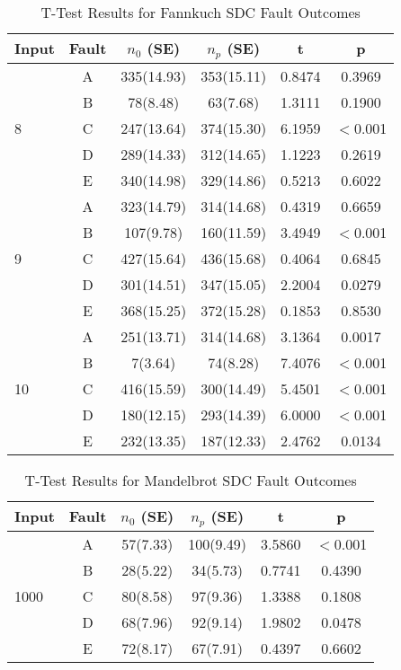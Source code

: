 \begin{table}[htbp]
\small{
\begin{center}
    \begin{tabular}{|p{0.7cm}|c|c|c|c|c|}
    \hline
    \textbf{Input} & \textbf{Fault} & \textbf{$n_0$ (SE)} & \textbf{$n_p$ (SE)} & \textbf{t} & \textbf{p} \\ \hline
    \multirow{5}{*}{8}
    & A & 335(14.93) & 353(15.11) & 0.8474 & 0.3969 \\
	& B & 78(8.48) & 63(7.68) & 1.3111 &  0.1900 \\
 	& C & 247(13.64) & 374(15.30) & 6.1959 & $<$0.001 \\
 	& D & 289(14.33) & 312(14.65) & 1.1223 & 0.2619 \\
 	& E & 340(14.98) & 329(14.86) & 0.5213 & 0.6022 \\ \hline
    \multirow{5}{*}{9}
    & A & 323(14.79) & 314(14.68) & 0.4319 & 0.6659 \\
	& B & 107(9.78) & 160(11.59) & 3.4949 & $<$0.001 \\
 	& C & 427(15.64) & 436(15.68) & 0.4064 & 0.6845 \\
 	& D & 301(14.51) & 347(15.05) & 2.2004 & 0.0279 \\
 	& E & 368(15.25) & 372(15.28) & 0.1853 & 0.8530 \\ \hline
 	\multirow{5}{*}{10}
    & A & 251(13.71) & 314(14.68) & 3.1364 & 0.0017 \\
	& B & 7(3.64) & 74(8.28) & 7.4076 & $<$0.001 \\
 	& C & 416(15.59) & 300(14.49) & 5.4501 & $<$0.001 \\
 	& D & 180(12.15) & 293(14.39) & 6.0000 & $<$0.001 \\
 	& E & 232(13.35) & 187(12.33) & 2.4762 & 0.0134 \\ \hline
    \hline
    \end{tabular}
    \end{center}
    }
    \caption{T-Test Results for Fannkuch SDC Fault Outcomes}
    \label{tab:Fannkuch_TTest}
\end{table}

\begin{table}[!htb]
\small{
\begin{center}
    \begin{tabular}{|p{0.7cm}|c|c|c|c|c|}
    \hline
    \textbf{Input} & \textbf{Fault} & \textbf{$n_0$ (SE)} & \textbf{$n_p$ (SE)} & \textbf{t} & \textbf{p} \\ \hline
    \multirow{5}{*}{1000}
    & A & 57(7.33) & 100(9.49) & 3.5860 & $<$0.001 \\
	& B & 28(5.22) & 34(5.73) & 0.7741 &  0.4390 \\
 	& C & 80(8.58) & 97(9.36) & 1.3388 & 0.1808 \\
 	& D & 68(7.96) & 92(9.14) & 1.9802 & 0.0478 \\
 	& E & 72(8.17) & 67(7.91) & 0.4397 & 0.6602 \\ \hline
    \hline
    \end{tabular}
    \end{center}
    }
    \caption{T-Test Results for Mandelbrot SDC Fault Outcomes}
    \label{tab:Mandelbrot_TTest}
\end{table}


